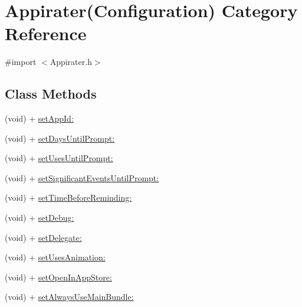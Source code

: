 \hypertarget{category_appirater_07_configuration_08}{\section{Appirater(Configuration) Category Reference}
\label{category_appirater_07_configuration_08}
}


{\ttfamily \#import $<$Appirater.\-h$>$}

\subsection*{Class Methods}
\begin{DoxyCompactItemize}
\item 
(void) + \hyperlink{category_appirater_07_configuration_08_afd088b35ecbacb5a668c934257080105}{set\-App\-Id\-:}
\item 
(void) + \hyperlink{category_appirater_07_configuration_08_a7cb08941166d52b1ea2b3465e5a580e2}{set\-Days\-Until\-Prompt\-:}
\item 
(void) + \hyperlink{category_appirater_07_configuration_08_a4722d2c18654f6f9dec3ba652eb48c2e}{set\-Uses\-Until\-Prompt\-:}
\item 
(void) + \hyperlink{category_appirater_07_configuration_08_a6cc24cf2ee76d544906077a85a8905ff}{set\-Significant\-Events\-Until\-Prompt\-:}
\item 
(void) + \hyperlink{category_appirater_07_configuration_08_af9c75e43b33915db4391ca7cd82c0822}{set\-Time\-Before\-Reminding\-:}
\item 
(void) + \hyperlink{category_appirater_07_configuration_08_a7f1099968e8814cea5c4447629369f84}{set\-Debug\-:}
\item 
(void) + \hyperlink{category_appirater_07_configuration_08_a2c80e4f19799e0f1ddfdae30a3ded4d5}{set\-Delegate\-:}
\item 
(void) + \hyperlink{category_appirater_07_configuration_08_afe8c4f2aef73581e25f26667b1769ae1}{set\-Uses\-Animation\-:}
\item 
(void) + \hyperlink{category_appirater_07_configuration_08_aac848666b0c8556d39f826f0baee78df}{set\-Open\-In\-App\-Store\-:}
\item 
(void) + \hyperlink{category_appirater_07_configuration_08_a6678910ac1acec127583334fde49ac20}{set\-Always\-Use\-Main\-Bundle\-:}
\end{DoxyCompactItemize}


